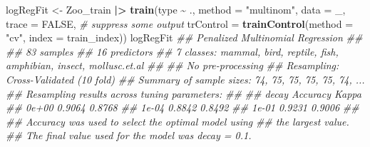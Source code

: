 \documentclass[
  notitlepage]{book}
\newenvironment{Shaded}{\begin{snugshade}}{\end{snugshade}}
\newcommand{\CommentTok}[1]{\textcolor[rgb]{0.56,0.35,0.01}{\textit{#1}}}
\newcommand{\DataTypeTok}[1]{\textcolor[rgb]{0.13,0.29,0.53}{#1}}
\newcommand{\ErrorTok}[1]{\textcolor[rgb]{0.64,0.00,0.00}{\textbf{#1}}}
\newcommand{\KeywordTok}[1]{\textcolor[rgb]{0.13,0.29,0.53}{\textbf{#1}}}
\newcommand{\NormalTok}[1]{#1}
\newcommand{\OperatorTok}[1]{\textcolor[rgb]{0.81,0.36,0.00}{\textbf{#1}}}
\newcommand{\OtherTok}[1]{\textcolor[rgb]{0.56,0.35,0.01}{#1}}
\newcommand{\StringTok}[1]{\textcolor[rgb]{0.31,0.60,0.02}{#1}}
\begin{document}
\begin{Shaded}
\begin{Highlighting}[]
\NormalTok{logRegFit \textless{}{-}}\StringTok{ }\NormalTok{Zoo\_train }\OperatorTok{|}\ErrorTok{\textgreater{}}\StringTok{ }\KeywordTok{train}\NormalTok{(type }\OperatorTok{\textasciitilde{}}\StringTok{ }\NormalTok{.,}
  \DataTypeTok{method =} \StringTok{"multinom"}\NormalTok{,}
  \DataTypeTok{data =}\NormalTok{ \_,}
  \DataTypeTok{trace =} \OtherTok{FALSE}\NormalTok{, }\CommentTok{\# suppress some output}
    \DataTypeTok{trControl =} \KeywordTok{trainControl}\NormalTok{(}\DataTypeTok{method =} \StringTok{"cv"}\NormalTok{, }
                             \DataTypeTok{index =}\NormalTok{ train\_index))}
\NormalTok{logRegFit}
\CommentTok{\#\# Penalized Multinomial Regression }
\CommentTok{\#\# }
\CommentTok{\#\# 83 samples}
\CommentTok{\#\# 16 predictors}
\CommentTok{\#\#  7 classes: \textquotesingle{}mammal\textquotesingle{}, \textquotesingle{}bird\textquotesingle{}, \textquotesingle{}reptile\textquotesingle{}, \textquotesingle{}fish\textquotesingle{}, \textquotesingle{}amphibian\textquotesingle{}, \textquotesingle{}insect\textquotesingle{}, \textquotesingle{}mollusc.et.al\textquotesingle{} }
\CommentTok{\#\# }
\CommentTok{\#\# No pre{-}processing}
\CommentTok{\#\# Resampling: Cross{-}Validated (10 fold) }
\CommentTok{\#\# Summary of sample sizes: 74, 75, 75, 75, 75, 74, ... }
\CommentTok{\#\# Resampling results across tuning parameters:}
\CommentTok{\#\# }
\CommentTok{\#\#   decay  Accuracy  Kappa }
\CommentTok{\#\#   0e+00  0.9064    0.8768}
\CommentTok{\#\#   1e{-}04  0.8842    0.8492}
\CommentTok{\#\#   1e{-}01  0.9231    0.9006}
\CommentTok{\#\# }
\CommentTok{\#\# Accuracy was used to select the optimal model using}
\CommentTok{\#\#  the largest value.}
\CommentTok{\#\# The final value used for the model was decay = 0.1.}
\end{Highlighting}
\end{Shaded}
\end{document}
